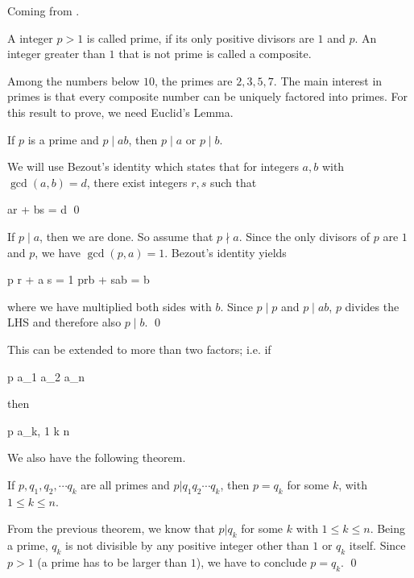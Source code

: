 
Coming from \cite{Burton2011}.

\begin{definition}
    A integer $p>1$ is called prime, if its only positive divisors are $1$ and $p$. An integer greater than $1$ that is not prime is called a composite.
\end{definition}

Among the numbers below $10$, the primes are $2, 3, 5, 7$. The main interest in primes is that every composite number can be uniquely factored into primes.  For this result to prove, we need Euclid's Lemma.

\begin{theorem}
    If $p$ is a prime and $p \mid ab$, then $p \mid a$ or $p \mid b$.
\end{theorem}

We will use Bezout's identity which states that for integers $a, b$ with $\gcd(a,b) = d$, there exist integers $r,s$ such that

\bee
ar + bs = d \qed
\eee

If $p \mid a$, then we are done. So assume that $p \nmid a$. Since the only divisors of $p$ are $1$ and $p$, we have $\gcd(p,a) = 1$. Bezout's identity yields

\bee
p r + a s = 1 \rightarrow prb + sab = b
\eee

where we have multiplied both sides with $b$. Since $p \mid p$ and $p \mid ab$, $p$ divides the LHS and therefore also $p \mid b$. \qed

This can be extended to more than two factors; i.e. if

\bee
p \mid a_1 a_2 \cdots a_n
\eee

then

\bee
p \mid a_k,  1 \leq k \leq n
\eee

We also have the following theorem.

\begin{theorem}\label{th:primes_01_01}
    If $p, q_1, q_2, \cdots q_k$ are all primes and $p | q_1 q_2 \cdots q_k$, then $p = q_k$ for some $k$, with $1 \leq k \leq n$.
\end{theorem}

From the previous theorem, we know that $p | q_k$ for some $k$ with $1 \leq k \leq n$. Being a prime, $q_k$ is not divisible by any positive integer other than $1$ or $q_k$ itself. Since $p>1$ (a prime has to be larger than $1$), we have to conclude $p = q_k$. \qed


